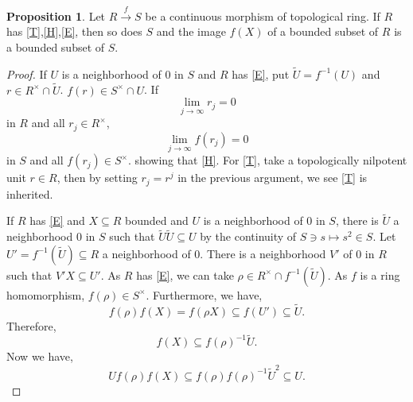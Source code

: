 \documentclass[10pt]{article}
\numberwithin{equation}{section}
\theoremstyle{definition}
\newtheorem{proposition}{Proposition}[subsection]
\begin{document}
\begin{proposition}
    \label{fact_11_4}
    Let $R\stackrel{f}{\to}S$ be a continuous morphism of topological ring. If $R$ has \eqref{T},\eqref{H},\eqref{E}, then so does $S$ and the image $f(X)$ of a bounded subset of $R$ is a bounded subset of $S$.
\end{proposition}
\begin{proof}
    If $U$ is a neighborhood of $0$ in $S$ and $R$ has \eqref{E}, put $\tilde{U}=f^{-1}(U)$ and $r\in R^\times\cap \tilde{U}$. $f(r)\in S^\times \cap U$. If
    \begin{equation*}
        \lim_{j\to\infty} r_j = 0
    \end{equation*}
    in $R$ and all $r_j\in R^\times$,
    \begin{equation*}
        \lim_{j\to\infty}f(r_j) = 0
    \end{equation*}
    in $S$ and all $f(r_j)\in S^\times$.
    showing that \eqref{H}. For \eqref{T}, take a topologically nilpotent unit $r\in R$, then by setting $r_j = r^j$ in the previous argument, we see \eqref{T} is inherited.
    \par If $R$ has \eqref{E} and $X\subseteq R$ bounded and $U$ is a neighborhood of $0$ in $S$, there is $\tilde{U}$ a neighborhood $0$ in $S$ such that $\tilde{U}\tilde{U}\subseteq U$ by the continuity of $S\ni s\mapsto s^2\in S$. Let $U' = f^{-1}(\tilde{U})\subseteq R$ a neighborhood of $0$. There is a neighborhood $V'$ of $0$ in $R$ such that $V'X\subseteq U'$. As $R$ has \eqref{E}, we can take $\rho\in R^\times\cap f^{-1}(\tilde{U})$. As $f$ is a ring homomorphism, $f(\rho)\in S^\times$.
    Furthermore, we have,
    \begin{equation*}
        f(\rho)f(X) = f(\rho X) \subseteq f(U')\subseteq \tilde{U}.
    \end{equation*}
    Therefore,
    \begin{equation*}
        f(X)\subseteq f(\rho)^{-1}\tilde{U}.
    \end{equation*}
    Now we have,
    \begin{equation*}
       U f(\rho)f(X) \subseteq f(\rho)f(\rho)^{-1}\tilde{U}^2\subseteq U.
    \end{equation*}
\end{proof}
\end{document}
